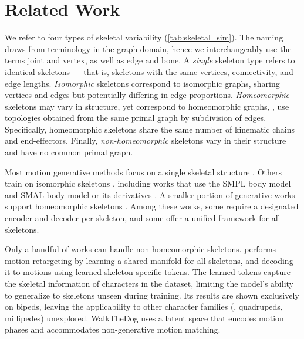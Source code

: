 \section{Related Work}
\label{sec:related_work}




We refer to four types of skeletal variability (\cref{tab:skeletal_sim}). The naming draws from terminology in the graph domain, hence we interchangeably use the terms joint and vertex, as well as edge and bone. 
A \emph{single} skeleton type refers to identical skeletons — that is, skeletons with the same vertices, connectivity, and edge lengths.
\emph{Isomorphic} skeletons correspond to isomorphic graphs, sharing vertices and edges but potentially differing in edge proportions.
\emph{Homeomorphic} skeletons may vary in structure, yet correspond to homeomorphic graphs, \ie,
use topologies obtained from the same primal graph by subdivision of edges. Specifically, homeomorphic skeletons share the same number of kinematic chains and end-effectors.
Finally, \emph{non-homeomorphic} skeletons vary in their structure and have no common primal graph. 

Most motion generative methods focus on a single skeletal structure \cite{raab2023modi, petrovich2021actor, karunratanakul2023gmd}. Others train on isomorphic skeletons \cite{zhang2023skinned,Villegas2021ContactAwareRO}, including works that use the SMPL \cite{loper2015smpl} 
body model
\cite{tripathi2024humos,jang2024geometry,petrovich2022temos} and SMAL \cite{zuffi20173d} 
body model
or its derivatives \cite{yang2023omnimotiongpt,rueegg2023barc}. A smaller portion of generative works support homeomorphic skeletons \cite{lee2023same,zhang2024skinned,cao2024car,studer2024factorized, ponton2024dragposer}. Among these works, some \cite{aberman2020skeleton} require a designated encoder and decoder per skeleton, and some \cite{zhang2024unified} 
offer a unified framework for all skeletons.

Only a handful of works can handle non-homeomorphic skeletons. \citet{martinelli2024moma} performs motion retargeting by learning a shared manifold for all skeletons, and decoding it to motions using learned skeleton-specific tokens.
The learned tokens capture the skeletal information of characters in the dataset, 
limiting the model's ability to generalize to skeletons unseen during training. Its results are shown exclusively on bipeds, leaving the applicability to other character families (\eg, quadrupeds, millipedes) unexplored.
WalkTheDog \cite{Li2024walkthedog} uses a latent space that encodes motion phases and accommodates non-generative motion matching. 

